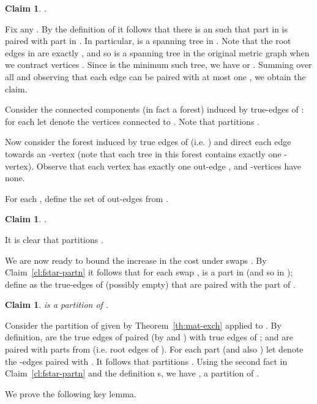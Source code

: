 \documentclass[11pt,twoside,a4paper]{article}
\newtheorem{claim}[theorem]{Claim}
\newenvironment{proof}{

\noindent{\bf Proof:}} {\hfill


}
\begin{document}
\begin{claim}\label{cl:kmf-m'}
.
\end{claim}
\begin{proof} Fix any . By the definition of  it follows that there is an 
such that part  in  is paired with part  in . In particular,   is a spanning tree in
. Note that the root edges in  are exactly , and so  is a spanning tree in the original metric
graph  when we contract vertices . Since  is the minimum such tree, we have  or . Summing over all  and observing that each edge  can be paired with at
most one , we obtain the claim.\end{proof}

Consider the connected components (in fact a forest) induced by true-edges of : for each  let 
denote the vertices connected to . Note that  partitions .

Now consider the forest induced by true edges of  (i.e. ) and direct each edge towards an -vertex
(note that each tree in this forest contains exactly one -vertex). Observe that each vertex 
has exactly one out-edge , and -vertices have none.

For each , define  the set of out-edges from .
\begin{claim}\label{cl:kmf-m*} .
\end{claim}
\begin{proof} It is clear that  partitions .\end{proof}

\medskip
We are now ready to bound the increase in the  cost under swaps \swap. By Claim~\ref{cl:fstar-partn} it follows
that for each swap ,  is a part in  (and so in ); define  as the true-edges of 
(possibly empty) that are paired with the part  of .

\begin{claim}\label{cl:kmf-Ea}  is a partition of .\end{claim}
\begin{proof}
Consider the partition  of  given by Theorem~\ref{th:mat-exch} applied to . By definition,  are the true edges of  paired (by  and ) with true edges of ; and  are
paired with parts from  (i.e. root edges of ). For each part  (and also ) let  denote the -edges paired with . It follows that  partitions . Using the
second fact in Claim~\ref{cl:fstar-partn} and the definition s, we have , a partition of .
\end{proof}

We prove the following key lemma.
\end{document}
